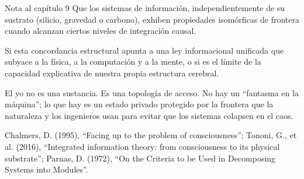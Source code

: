 \begin{notacap}{Nota al capítulo 9}
 Que los sistemas de información, independientemente de su sustrato (silicio, gravedad o carbono), exhiben propiedades isomórficas de frontera cuando alcanzan ciertos niveles de integración causal.

 Si esta concordancia estructural apunta a una ley informacional unificada que subyace a la física, a la computación y a la mente, o si es el límite de la capacidad explicativa de nuestra propia estructura cerebral.

 El yo no es una sustancia. Es una topología de acceso. No hay un “fantasma en la máquina”; lo que hay es un estado privado protegido por la frontera que la naturaleza y los ingenieros usan para evitar que los sistemas colapsen en el caos.

 Chalmers, D. (1995), “Facing up to the problem of consciousness”; Tononi, G., et al. (2016), “Integrated information theory: from consciousness to its physical substrate”; Parnas, D. (1972), “On the Criteria to be Used in Decomposing Systems into Modules”.
\end{notacap}

